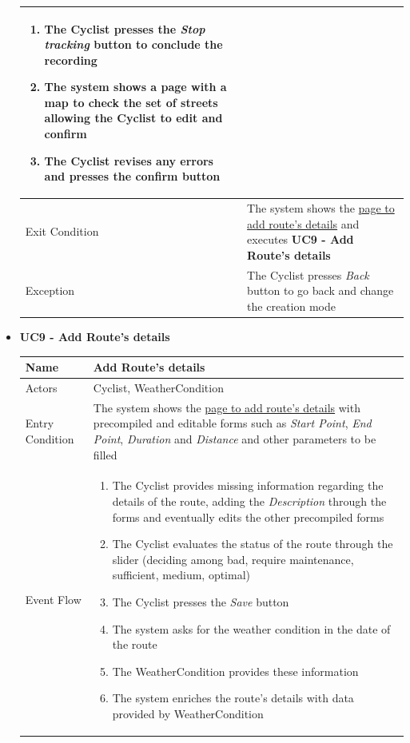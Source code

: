 \begin{itemize}
\begin{tabular}{|p{7cm}|p{7cm}|}
\begin{enumerate}
    \item The Cyclist presses the \textit{Stop tracking} button to conclude the recording
    \item The system shows a page with a map to check the set of streets allowing the Cyclist to edit and confirm
    \item The Cyclist revises any errors and presses the confirm button
\end{enumerate}
\\ \hline
Exit Condition  & The system shows the  \hyperref[fig:CreateRouteManualDetails]{ page to add route’s details}  and executes \textbf{UC9 - Add Route’s details} \\ \hline
Exception       & The Cyclist presses \textit{Back} button to go back and change the creation mode
\\ \hline
\end{tabular}
\newpage
\item \textbf{UC9 - Add Route's details}\par\smallskip
\noindent
\begin{tabular}{|p{7cm}|p{7cm}|}
\hline
Name            & Add Route's details \\ \hline
Actors          & Cyclist, WeatherCondition \\ \hline
Entry Condition & The system shows the  \hyperref[fig:CreateRouteManualDetails]{ page to add route’s details} with precompiled and editable forms such as \textit{Start Point}, \textit{End Point}, \textit{Duration} and \textit{Distance} and other parameters to be filled \\ \hline
Event Flow      &
\begin{enumerate}
    \item The Cyclist provides missing information regarding the details of the route, adding the \textit{Description} through the forms and eventually edits the other precompiled forms
    \item The Cyclist evaluates the status of the route through the slider (deciding among bad, require maintenance, sufficient, medium, optimal)
    \item The Cyclist presses the \textit{Save} button

    \item The system asks for the weather condition in the date of the route 
    \item The WeatherCondition provides these information
    \item The system enriches the route's details with data provided by  WeatherCondition


\end{enumerate}
\end{tabular}
\end{itemize}
